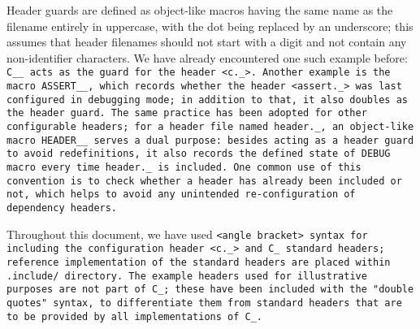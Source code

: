 Header guards are defined as object-like macros having
the same name as the filename entirely in uppercase,
with the dot being replaced by an underscore;
this assumes that header filenames should not start with
a digit and not contain any non-identifier characters.
We have already encountered one such example before:
\tt{C__} acts as the guard for the header \tt{<c._>}.
Another example is the macro \tt{ASSERT__}, which records whether
the header \tt{<assert._>} was last configured in debugging mode;
in addition to that, it also doubles as the header guard.
The same practice has been adopted for other configurable headers;
for a header file named \tt{header._},
an object-like macro \tt{HEADER__} serves a dual purpose:
besides acting as a header guard to avoid redefinitions, it also records the
\tt{defined} state of \tt{DEBUG} macro every time \tt{header._} is included.
One common use of this convention is to check
whether a header has already been included or not,
which helps to avoid any unintended re-configuration of dependency headers.

Throughout this document, we have used \tt{<}angle bracket\tt{>} syntax
for including the configuration header \tt{<c._>} and C\_ standard headers;
reference implementation of the standard headers
are placed within \tt{.include/} directory.
The example headers used for illustrative purposes are not part of C\_; these
have been included with the \tt{"}double quotes\tt{"} syntax, to differentiate
them from standard headers that are to be provided by all implementations of C\_.
